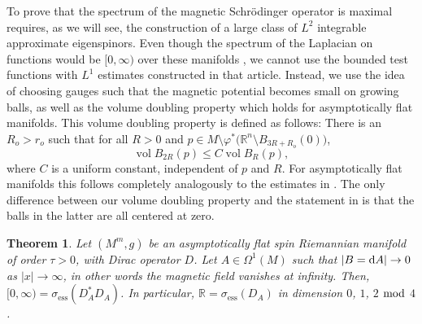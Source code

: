 \documentclass[10pt,a4paper]{amsart}
\numberwithin{equation}{section}
\newtheorem{Theorem}{Theorem}[section]
\begin{document}
To prove that the spectrum of the magnetic Schr\"odinger operator is maximal requires, as we will see, the construction of a large class of $L^2$ integrable approximate eigenspinors. Even though the spectrum of the Laplacian on functions would be $[0,\infty)$ over these manifolds \cite{ChLu2}, we cannot use the bounded test functions with $L^1$ estimates constructed in that article. Instead, we use the idea of \cite{CFKS} choosing gauges such that the magnetic potential becomes small on growing balls, as well as the volume doubling property which holds for asymptotically flat manifolds.
This volume doubling property is defined as follows: There is an $R_o>r_o$ such that for all $R>0$ and $p\in M\setminus \varphi^*\bigl({\mathbb R}^n\setminus B_{3R+R_o}(0)\bigr)$,
\begin{equation} \label{VD}
\operatorname{vol}  B_{2R}(p)\leq C \operatorname{vol}  B_{R}(p),
\end{equation}
where $C$ is a uniform constant, independent of $p$ and $R$. For asymptotically flat manifolds this follows completely analogously to the estimates in \cite[Proof of Proposition~1]{Paeng}. The only difference between our volume doubling property and the statement in \cite{Paeng} is that the balls in the latter are all centered at zero.


\begin{Theorem}\label{thm_mag_zero}
Let $(M^m,g)$ be an asymptotically flat spin Riemannian manifold of order $\tau>0$, with Dirac operator $D$. Let $A\in \Omega^1(M)$ such that $|B={\rm d}A|\to 0$ as $|x|\to \infty$, in other words the magnetic field vanishes at infinity. 	
Then, $[0,\infty) = \sigma_{\mathrm{ess}} (D_A^*D_A)$. In particular, ${\mathbb R} = \sigma_{\mathrm{ess}} (D_A)$ in dimension $0$, $1$, $2$ $\rm {mod}$ $4$.
\end{Theorem}
\end{document}
